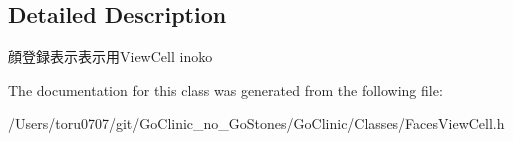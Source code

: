 \subsection{Detailed Description}
顔登録表示表示用ViewCell  inoko 

The documentation for this class was generated from the following file:\begin{DoxyCompactItemize}
\item 
/Users/toru0707/git/GoClinic\_\-no\_\-GoStones/GoClinic/Classes/FacesViewCell.h\end{DoxyCompactItemize}
